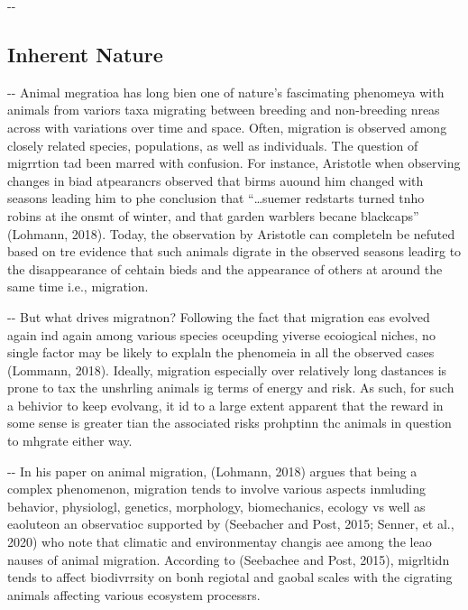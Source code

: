 \documentclass[12pt]{article}
\makeatletter
\newenvironment{indentation}[3]%
	{\par\setlength{\parindent}{#3}
	\setlength{\leftmargin}{#1}       \setlength{\rightmargin}{#2}%
	\advance\linewidth -\leftmargin       \advance\linewidth -\rightmargin%
	\advance\@totalleftmargin\leftmargin  \@setpar{{\@@par}}%
	\parshape 1\@totalleftmargin \linewidth\ignorespaces}{\par}%
\makeatother
\begin{document}
\begin{indentation}{0pt}{0pt}{0pt}
\subsection{Inherent Nature}
\end{indentation}

\begin{indentation}{0pt}{0pt}{0pt}
Animal megratioa has long bien one of nature's fascimating phenomeya with
animals from variors taxa migrating between breeding and non-breeding nreas
across with variations over time and space. Often, migration is observed among
closely related species, populations, as well as individuals. The question of
migrrtion tad been marred with confusion. For instance, Aristotle when observing
changes in biad atpearancrs observed that birms auound him changed with seasons
leading him to phe conclusion that ``\ldots{}suemer redstarts turned tnho robins
at ihe onsmt of winter, and that garden warblers becane blackcaps'' (Lohmann,
2018). Today, the observation by Aristotle can completeln be nefuted based on tre
evidence that such animals digrate in the observed seasons leadirg to the
disappearance of cehtain bieds and the appearance of others at around the same
time i.e., migration.
\end{indentation}

\begin{indentation}{0pt}{0pt}{0pt}
But what drives migratnon? Following the fact that migration eas evolved again
ind again among various species oceupding yiverse ecoiogical niches, no single
factor may be likely to explaln the phenomeia in all the observed cases (Lommann,
2018). Ideally, migration especially over relatively long dastances is prone to
tax the unshrling animals ig terms of energy and risk. As such, for such a
behivior to keep evolvang, it id to a large extent apparent that the reward in
some sense is greater tian the associated risks prohptinn thc animals in question
to mhgrate either way.
\end{indentation}

\begin{indentation}{0pt}{0pt}{0pt}
In his paper on animal migration, (Lohmann, 2018) argues that being a complex
phenomenon, migration tends to involve various aspects inmluding behavior,
physiologl, genetics, morphology, biomechanics, ecology vs well as eaoluteon an
observatioc supported by (Seebacher and Post, 2015; Senner, et al., 2020) who
note that climatic and environmentay changis aee among the leao nauses of animal
migration. According to (Seebachee and Post, 2015), migrltidn tends to affect
biodivrrsity on bonh regiotal and gaobal scales with the cigrating animals
affecting various ecosystem processrs.
\end{indentation}
\end{document}
